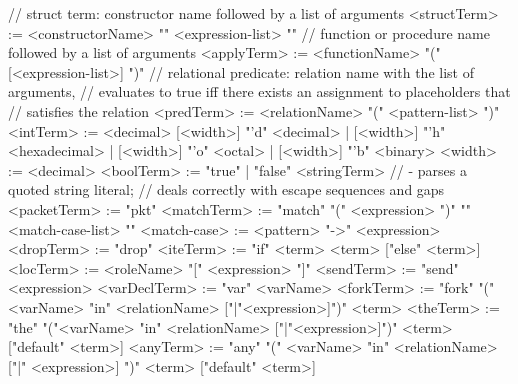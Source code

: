 \documentclass{report}
\begin{document}
\begin{bnflisting}{}
// struct term: constructor name followed by a list of arguments
<structTerm>   := <constructorName> "{" <expression-list> "}"
// function or procedure name followed by a list of arguments
<applyTerm>    := <functionName> "(" [<expression-list>] ")"
// relational predicate: relation name with the list of arguments,
// evaluates to true iff there exists an assignment to placeholders that
// satisfies the relation
<predTerm>     := <relationName> "(" <pattern-list> ")"
<intTerm>      := <decimal>
                  [<width>] "'d" <decimal>
                | [<width>] "'h" <hexadecimal>
                | [<width>] "'o" <octal>
                | [<width>] "'b" <binary>
<width> := <decimal>
<boolTerm>     := "true" | "false"
<stringTerm>   // - parses a quoted string literal; 
               //   deals correctly with escape sequences and gaps
<packetTerm>   := "pkt"
<matchTerm>    := "match" "(" <expression> ")" "{"
                       <match-case-list>
                  "}"
<match-case>   := <pattern> "->" <expression>
<dropTerm>     := "drop"
<iteTerm>      := "if" <term> <term> ["else" <term>]
<locTerm>      := <roleName> "[" <expression> "]"
<sendTerm>     := "send" <expression>
<varDeclTerm>  := "var" <varName>
<forkTerm>     := "fork" "("<varName> "in" <relationName> ["|"<expression>]")" 
                         <term>
<theTerm>      := "the" "("<varName> "in" <relationName> ["|"<expression>]")" 
                        <term>
                        ["default" <term>]
<anyTerm>      := "any" "(" <varName> "in" <relationName> ["|" <expression>] ")" 
                   <term>
                   ["default" <term>]
\end{bnflisting}
\end{document}
